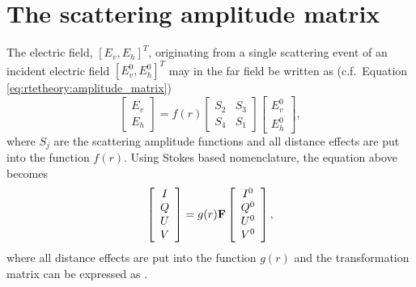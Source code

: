 




\section{The scattering amplitude matrix}
\label{sec:polarization:ampmatrix}
The electric field, $[E_v,E_h]^T$, originating from a single
scattering event of an incident electric field $[E_v^0,E_h^0]^T$ may
in the far field be written as (c.f.\ Equation \ref{eq:rtetheory:amplitude_matrix})
\begin{equation}
  \label{eq:polarisation:ampmatrix1}
   \left[ \begin{array}{c} E_v \\ E_h \end{array} \right] =
   f(r)
   \left[ \begin{array}{cc} S_2 & S_3 \\ S_4 & S_1 \end{array} \right]
   \left[ \begin{array}{c} E_v^0 \\ E_h^0 \end{array} \right], 
\end{equation}
where $S_j$ are the scattering amplitude functions and all distance
effects are put into the function $f(r)$. Using Stokes based
nomenclature, the equation above becomes
\begin{equation}
  \label{eq:polarisation:ampmatrix2}
   \left[ \begin{array}{c} I\\Q\\U\\V \end{array} \right] =
   g(r)\mathbf{F}
   \left[ \begin{array}{c} I^0\\Q^0\\U^0\\V^0 \end{array} \right],
\end{equation}
where all distance effects are put into the function $g(r)$ and the
transformation matrix  can be expressed as \citep[Sec.\ 5.4.3]{liou:02}.
